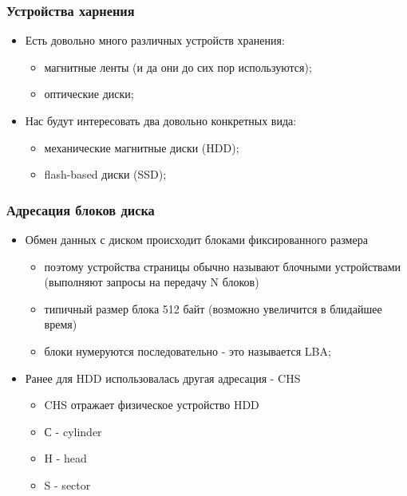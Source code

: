 \begin{frame}
\frametitle{Устройства харнения}
\begin{itemize}
  \item<1-> Есть довольно много различных устройств хранения:
    \begin{itemize}
      \item магнитные ленты (и да они до сих пор используются);
      \item оптические диски;
    \end{itemize}
  \item<2-> Нас будут интересовать два довольно конкретных вида:
    \begin{itemize}
      \item механические магнитные диски (HDD);
      \item flash-based диски (SSD);
    \end{itemize}
\end{itemize}
\end{frame}

\begin{frame}
\frametitle{Адресация блоков диска}
\begin{itemize}
  \item<1-> Обмен данных с диском происходит блоками фиксированного размера
    \begin{itemize}
      \item поэтому устройства страницы обычно называют блочными устройствами (выполняют запросы на передачу N блоков)
      \item типичный размер блока 512 байт (возможно увеличится в блидайшее время)
      \item блоки нумеруются последовательно - это называется LBA;
    \end{itemize}
  \item<2-> Ранее для HDD использовалась другая адресация - CHS
    \begin{itemize}
      \item CHS отражает физическое устройство HDD
      \item С - cylinder
      \item H - head
      \item S - sector
    \end{itemize}
\end{itemize}
\end{frame}

